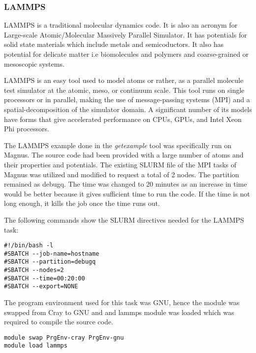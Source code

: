 \subsubsection{LAMMPS}

LAMMPS is a traditional molecular dynamics code. It is also an acronym for Large-scale Atomic/Molecular Massively Parallel Simulator. It has potentials
for solid state materials which include metals and semicoductors. It also has potential for delicate matter i.e biomolecules and polymers and
coarse-grained or mesoscopic systems.

LAMMPS is an easy tool used to model atoms or rather, as a parallel molecule test simulator at the atomic, meso, or continuum scale. This tool runs on
single processors or in parallel, making the use of message-passing systems (MPI) and a spatial-decomposition of the simulator domain. A significant
number of its models have forms that give accelerated performance on CPUs, GPUs, and Intel Xeon Phi processors.

The LAMMPS example done in the \emph{getexample} tool was specifically run on Magnus. The source code had been provided with a large number of atoms and their
properties and potentials. The existing SLURM file of the MPI tasks of Magnus was utilized and modified to request a total of 2 nodes. The partition
remained as debugq. The time was changed to 20 minutes as an increase in time would be better because it gives sufficient time to run the code. If the 
time is not long enough, it kills the job once the time runs out.

The following commands show the SLURM directives needed for the LAMMPS task:

\begin{tcolorbox}
\begin{Verbatim}[fontsize=\scriptsize]
#!/bin/bash -l
#SBATCH --job-name=hostname
#SBATCH --partition=debugq
#SBATCH --nodes=2
#SBATCH --time=00:20:00
#SBATCH --export=NONE
\end{Verbatim}
\end{tcolorbox}

The program environment used for this task was GNU, hence the module was swapped from Cray to GNU and and lammps module was loaded which was required
to compile the source code. 

\begin{tcolorbox}
\begin{Verbatim}[fontsize=\scriptsize]
module swap PrgEnv-cray PrgEnv-gnu
module load lammps
\end{Verbatim}
\end{tcolorbox}

